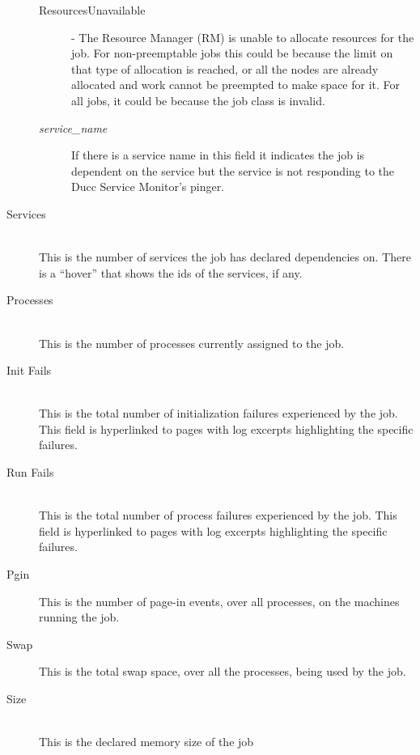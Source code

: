 \begin{description}
\begin{description}
                  \item[ResourcesUnavailable] - The Resource Manager (RM) is unable to allocate resources for 
                    the job. For non-preemptable jobs this could be because the limit on that type of allocation is 
                    reached, or all the nodes are already allocated and work cannot be preempted to make space for 
                    it. For all jobs, it could be because the job class is invalid. 
                    \item[{\em service\_name}] If there is a service name in this field it indicates the job is
                      dependent on the service but the service is not responding to the Ducc Service Monitor's
                      pinger.
              \end{description}

            \item[Services] \hfill \\
              This is the number of services the job has declared dependencies on.  There is a ``hover'' that
              shows the ids of the services, if any.

            \item[Processes] \hfill \\
              This is the number of processes currently assigned to the job.

            \item[Init Fails] \hfill \\
              This is the total number of initialization failures experienced by the job. This
              field is hyperlinked to pages with log excerpts highlighting the specific failures.
              
            \item[Run Fails] \hfill \\
              This is the total number of process failures experienced by the job. This field is
              hyperlinked to pages with log excerpts highlighting the specific failures.
              
            \item[Pgin] This is the number of page-in events, over all processes, on the machines
              running the job.

            \item[Swap] This is the total swap space, over all the processes, being used by the job.

            \item[Size] \hfill \\
              This is the declared memory size of the job
              

\end{description}
